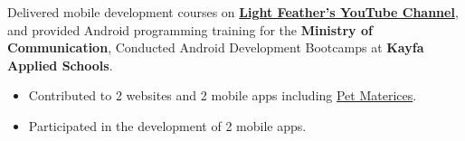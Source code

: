\documentclass[10pt,a4paper,ragged2e,withhyper]{altacv}
\begin{document}
Delivered mobile development courses on \textcolor{TertiaryColor}{\textbf{\href{https://www.youtube.com/c/LightFeather42}{Light Feather's YouTube Channel}}}, and provided Android programming training for the \textbf{\textcolor{TertiaryColor}{Ministry of Communication}},
Conducted Android Development Bootcamps at \textcolor{TertiaryColor}{\textbf{Kayfa Applied Schools}}.\linebreak
\divider


\small\begin{itemize}
\item Contributed to 2 websites and 2 mobile apps including  \hyperlink{pet_materices}{Pet Materices}.
\end{itemize}
\divider

\small\begin{itemize}
\item Participated in the development of 2 mobile apps.
\end{itemize}





\end{document}
